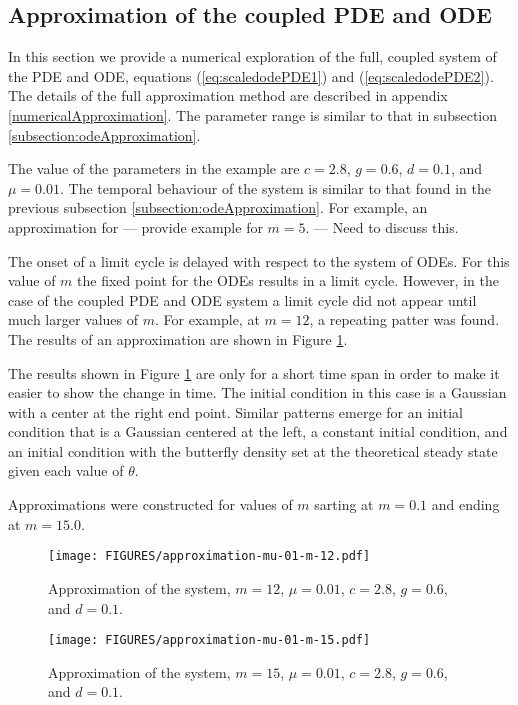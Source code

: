 \documentclass[review,authoryear]{elsarticle}
\begin{document}
\subsection{Approximation of the coupled PDE and ODE}

In this section we provide a  numerical exploration of the full, coupled system of the PDE and
ODE, equations (\ref{eq:scaledodePDE1}) and (\ref{eq:scaledodePDE2}). The details of the full approximation method are
described in appendix \ref{numericalApproximation}. The parameter
range is similar to that in subsection
\ref{subsection:odeApproximation}.

The value of the parameters in the example are $c=2.8$, $g=0.6$,
$d=0.1$, and $\mu=0.01$. The temporal behaviour of the system is
similar to that found in the previous subsection
\ref{subsection:odeApproximation}. For example, an approximation for
--- provide example for $m=5$. --- Need to discuss this.

The onset of a limit cycle is delayed with respect to the system of
ODEs. For this value of $m$ the fixed point for the ODEs results in a
limit cycle. However, in the case of the coupled PDE and ODE system a
limit cycle did not appear until much larger values of $m$. For
example, at $m=12$, a repeating patter was found. The results of an
approximation are shown in Figure \ref{fig:approximationM12Mu01}.

The results shown in Figure \ref{fig:approximationM12Mu01} are only
for a short time span in order to make it easier to show the change in
time. The initial condition in this case is a Gaussian with a center
at the right end point.  Similar patterns emerge for an initial
condition that is a Gaussian centered at the left, a constant initial
condition, and an initial condition with the butterfly density set at
the theoretical steady state given each value of $\theta$.


Approximations were constructed for
values of $m$ sarting at $m=0.1$ and ending at $m=15.0$.


\begin{figure}[htb]
  \centering
  \texttt{[image: FIGURES/approximation-mu-01-m-12.pdf]}
  \caption[Approximation with $m=12$ and $\mu=0.01$.]{Approximation of
    the system, $m=12$, $\mu=0.01$, $c=2.8$, $g=0.6$, and $d=0.1$. }
  \label{fig:approximationM12Mu01}
\end{figure}

\begin{figure}[htb]
  \centering
  \texttt{[image: FIGURES/approximation-mu-01-m-15.pdf]}
  \caption[Approximation with $m=15$ and $\mu=0.01$.]{Approximation of
    the system, $m=15$, $\mu=0.01$, $c=2.8$, $g=0.6$, and $d=0.1$. }
  \label{fig:approximationM15Mu01}
\end{figure}
\end{document}
